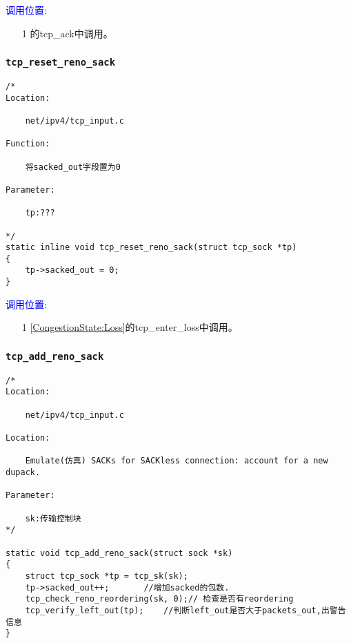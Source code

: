         \textcolor{blue}{调用位置}:
            \begin{enumerate}
                \item[1]        \label{ClientReceiveSYN+ACK:tcp_ack}的tcp\_ack中调用。
            \end{enumerate}

        \subsubsection{\texttt{tcp_reset_reno_sack}}
            \label{ACKUpdate:tcp_reset_reno_sack}
\begin{verbatim}
/*
Location:

    net/ipv4/tcp_input.c

Function:

    将sacked_out字段置为0

Parameter:

    tp:???

*/
static inline void tcp_reset_reno_sack(struct tcp_sock *tp)
{
    tp->sacked_out = 0;
}
\end{verbatim}    

        \textcolor{blue}{调用位置}:
            \begin{enumerate}
                \item[1]        \ref{CongestionState:Loss}的tcp\_enter\_loss中调用。
            \end{enumerate}

        \subsubsection{\texttt{tcp_add_reno_sack}}
            \label{ACKUpdate:tcp_add_reno_sack}
\begin{verbatim}
/* 
Location:

    net/ipv4/tcp_input.c

Location:

    Emulate(仿真) SACKs for SACKless connection: account for a new dupack.

Parameter:

    sk:传输控制块
*/

static void tcp_add_reno_sack(struct sock *sk)
{
    struct tcp_sock *tp = tcp_sk(sk);
    tp->sacked_out++;       //增加sacked的包数.
    tcp_check_reno_reordering(sk, 0);// 检查是否有reordering
    tcp_verify_left_out(tp);    //判断left_out是否大于packets_out,出警告信息
}
\end{verbatim}

